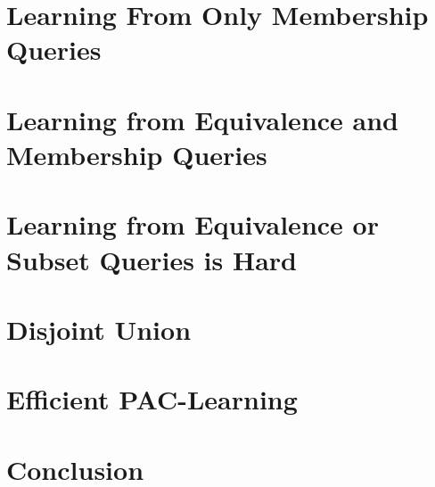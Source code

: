 \documentclass[runningheads]{llncs}
\begin{document}
\section{Learning From Only Membership Queries}


\section{Learning from Equivalence and Membership Queries}


\section{Learning from Equivalence or Subset Queries is Hard}


\section{Disjoint Union}


\section{Efficient PAC-Learning}


\section{Conclusion}




\end{document}
